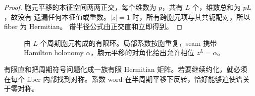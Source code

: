 \begin{proof}
胞元平移的本征空间两两正交，每个维数为 $p$，共有 $L$ 个，维数总和为 $pL$，故没有
遗漏任何本征值或重数。$|z|=1$ 时，所有跨胞元项与其共轭配对，所以 fiber 为 Hermitian。
谱半径公式由正交直和立即得到。
\end{proof}

\begin{figure}[t]
 \centering
 
 \caption{由 $L$ 个周期胞元构成的有限环。局部系数按胞重复，seam 携带 Hamilton
 holonomy $\alpha$，胞元平移的对角化给出允许相位 $z^L=\alpha$。}
 \label{fig:finite-bloch}
\end{figure}

有限直和把周期符号问题化成一族有限 Hermitian 矩阵。若要继续约化，就必须在每个 fiber
内部找到对称。系数 word 在半周期平移下反转，恰好能够迫使谱关于零对称。
